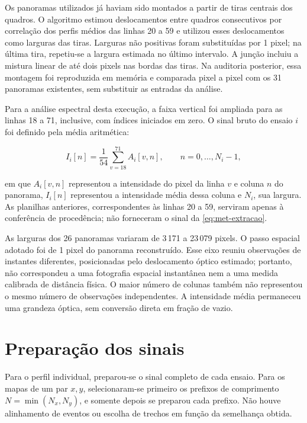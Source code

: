 Os panoramas utilizados já haviam sido montados a partir de tiras centrais dos
quadros. O algoritmo estimou deslocamentos entre quadros consecutivos por
correlação dos perfis médios das linhas 20 a 59 e utilizou esses deslocamentos como
larguras das tiras. Larguras não positivas foram substituídas por 1 pixel; na última
tira, repetiu-se a largura estimada no último intervalo. A junção incluiu a mistura
linear de até dois pixels nas bordas das tiras. Na auditoria posterior, essa
montagem foi reproduzida em memória e comparada pixel a pixel com os 31 panoramas
existentes, sem substituir as entradas da análise.

Para a análise espectral desta execução, a faixa vertical foi ampliada para as
linhas 18 a 71, inclusive, com índices iniciados em zero. O sinal bruto do ensaio
$i$ foi definido pela média aritmética:

\begin{equation}\label{eq:met-extracao}
  I_i[n]=\frac{1}{54}\sum_{v=18}^{71} A_i[v,n],
  \qquad n=0,\ldots,N_i-1,
\end{equation}

\noindent
em que $A_i[v,n]$ representou a intensidade do pixel da linha $v$ e coluna $n$ do panorama,
$I_i[n]$ representou a intensidade média dessa coluna e $N_i$, sua largura. As planilhas
anteriores, correspondentes às linhas 20 a 59, serviram apenas à conferência de
procedência; não forneceram o sinal da \autoref{eq:met-extracao}.

As larguras dos 26 panoramas variaram de 3\,171 a 23\,079 pixels. O passo espacial
adotado foi de 1 pixel do panorama reconstruído. Esse eixo reuniu observações de
instantes diferentes, posicionadas pelo deslocamento óptico estimado; portanto,
não correspondeu a uma fotografia espacial instantânea nem a uma medida calibrada
de distância física. O maior número de colunas também não representou o mesmo
número de observações independentes. A intensidade média permaneceu uma grandeza
óptica, sem conversão direta em fração de vazio.

\section{Preparação dos sinais}\label{sec:met-preproc}

Para o perfil individual, preparou-se o sinal completo de cada ensaio. Para os
mapas de um par $x,y$, selecionaram-se primeiro os prefixos de comprimento
$N=\min(N_x,N_y)$, e somente depois se preparou cada prefixo. Não houve alinhamento
de eventos ou escolha de trechos em função da semelhança obtida.

